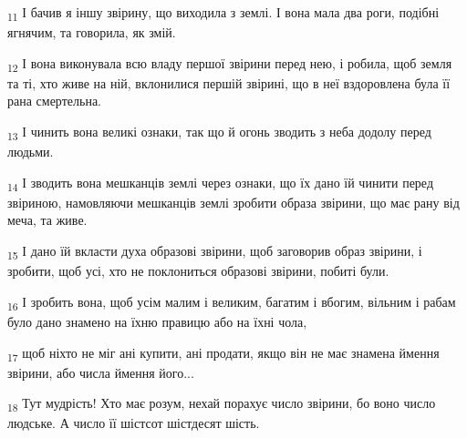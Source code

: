 \begin{tcolorbox}
\textsubscript{11} І бачив я іншу звірину, що виходила з землі. І вона мала два роги, подібні ягнячим, та говорила, як змій.
\end{tcolorbox}
\begin{tcolorbox}
\textsubscript{12} І вона виконувала всю владу першої звірини перед нею, і робила, щоб земля та ті, хто живе на ній, вклонилися першій звірині, що в неї вздоровлена була її рана смертельна.
\end{tcolorbox}
\begin{tcolorbox}
\textsubscript{13} І чинить вона великі ознаки, так що й огонь зводить з неба додолу перед людьми.
\end{tcolorbox}
\begin{tcolorbox}
\textsubscript{14} І зводить вона мешканців землі через ознаки, що їх дано їй чинити перед звіриною, намовляючи мешканців землі зробити образа звірини, що має рану від меча, та живе.
\end{tcolorbox}
\begin{tcolorbox}
\textsubscript{15} І дано їй вкласти духа образові звірини, щоб заговорив образ звірини, і зробити, щоб усі, хто не поклониться образові звірини, побиті були.
\end{tcolorbox}
\begin{tcolorbox}
\textsubscript{16} І зробить вона, щоб усім малим і великим, багатим і вбогим, вільним і рабам було дано знамено на їхню правицю або на їхні чола,
\end{tcolorbox}
\begin{tcolorbox}
\textsubscript{17} щоб ніхто не міг ані купити, ані продати, якщо він не має знамена ймення звірини, або числа ймення його...
\end{tcolorbox}
\begin{tcolorbox}
\textsubscript{18} Тут мудрість! Хто має розум, нехай порахує число звірини, бо воно число людське. А число її шістсот шістдесят шість.
\end{tcolorbox}
